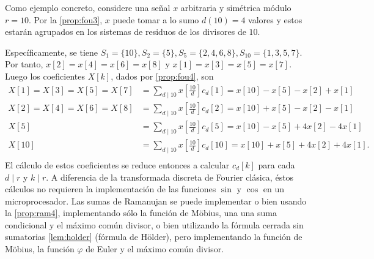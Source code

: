 \begin{example}
Como ejemplo concreto, considere una señal $x$ arbitraria y simétrica módulo $r=10$. Por la \cref{prop:fou3}, $x$ puede tomar a lo sumo $d(10)=4$ valores y estos estarán agrupados en los sistemas de residuos de los divisores de $10$.
\bigskip

Específicamente, se tiene $S_1 = \{ 10 \}, S_2 = \{ 5 \}, S_5 = \{ 2, 4, 6, 8 \}, S_{10} = \{ 1, 3, 5, 7 \}$. Por tanto, $x[2]=x[4]=x[6]=x[8]$ y $x[1]=x[3]=x[5]=x[7]$. Luego los coeficientes $X[k]$, dados por \ref{prop:fou4}, son
\begin{align*}
    X[1] = X[3] = X[5] = X[7] & = \sum_{d \mid 10} x \left[ \frac{10}{d} \right] c_d[1] = x[10] - x[5] - x[2] + x[1] \\
    X[2] = X[4] = X[6] = X[8] & = \sum_{d \mid 10} x \left[ \frac{10}{d} \right] c_d[2] = x[10] + x[5] - x[2] - x[1] \\
    X[5] & = \sum_{d \mid 10} x \left[ \frac{10}{d} \right] c_d[5] = x[10] - x[5] + 4 x[2] - 4 x[1] \\
    X[10] & = \sum_{d \mid 10} x \left[ \frac{10}{d} \right] c_d[10] = x[10] + x[5] + 4 x[2] + 4 x[1]. \\
\end{align*}
El cálculo de estos coeficientes se reduce entonces a calcular $c_d[k]$ para cada $d \mid r$ y $k \mid r$. A diferencia de la transformada discreta de Fourier clásica, éstos cálculos no requieren la implementación de las funciones $\sin$ y $\cos$ en un microprocesador. Las sumas de Ramanujan se puede implementar o bien usando la \cref{prop:ram4}, implementando sólo la función de Möbius, una una suma condicional y el máximo común divisor, o bien utilizando la fórmula cerrada sin sumatorias \ref{lem:holder} (fórmula de Hölder), pero implementando la función de Möbius, la función $\varphi$ de Euler y el máximo común divisor.
\end{example}

